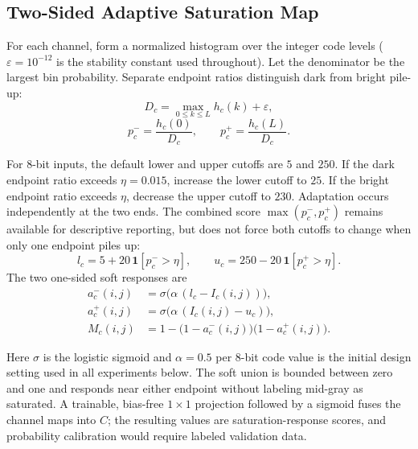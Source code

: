\documentclass[5p,times,twocolumn]{elsarticle}
\begin{document}
\subsection{Two-Sided Adaptive Saturation Map}
\label{sec:clipping}

For each channel, form a normalized histogram over the integer code levels
($\varepsilon = 10^{-12}$ is the stability constant used throughout). Let the
denominator be the largest bin probability. Separate endpoint ratios
distinguish dark from bright pile-up:
\begin{equation}
D_c = \max_{0 \le k \le L} h_c(k) + \varepsilon,
\label{eq:denom}
\end{equation}
\begin{equation}
p_c^- = \frac{h_c(0)}{D_c}, \qquad p_c^+ = \frac{h_c(L)}{D_c}.
\label{eq:endpoints}
\end{equation}

For 8-bit inputs, the default lower and upper cutoffs are $5$ and $250$. If
the dark endpoint ratio exceeds $\eta = 0.015$, increase the lower cutoff to
$25$. If the bright endpoint ratio exceeds $\eta$, decrease the upper cutoff
to $230$. Adaptation occurs independently at the two ends. The combined score
$\max(p_c^-, p_c^+)$ remains available for descriptive reporting, but does not
force both cutoffs to change when only one endpoint piles up:
\begin{equation}
l_c = 5 + 20\,\mathbf{1}[p_c^- > \eta], \qquad
u_c = 250 - 20\,\mathbf{1}[p_c^+ > \eta].
\label{eq:cutoffs}
\end{equation}
The two one-sided soft responses are
\begin{align}
a_c^-(i,j) &= \sigma\!\big(\alpha\,(l_c - I_c(i,j))\big),
\label{eq:alo}\\
a_c^+(i,j) &= \sigma\!\big(\alpha\,(I_c(i,j) - u_c)\big),
\label{eq:ahi}\\
M_c(i,j) &= 1 - \big(1 - a_c^-(i,j)\big)\big(1 - a_c^+(i,j)\big).
\label{eq:union}
\end{align}

Here $\sigma$ is the logistic sigmoid and $\alpha = 0.5$ per 8-bit code value
is the initial design setting used in all experiments below. The soft union is
bounded between zero and one and responds near either endpoint without
labeling mid-gray as saturated. A trainable, bias-free $1 \times 1$
projection followed by a sigmoid fuses the channel maps into $C$; the
resulting values are saturation-response scores, and probability calibration
would require labeled validation data.
\end{document}
